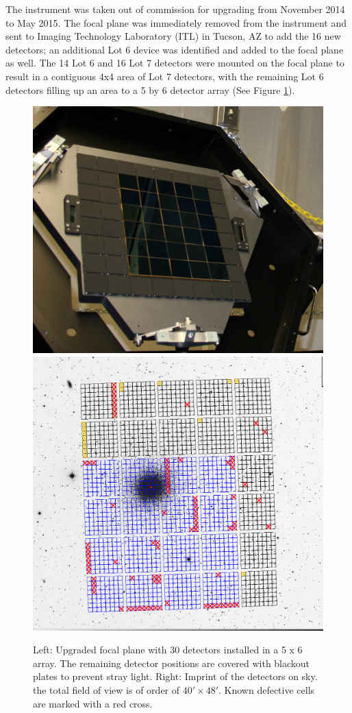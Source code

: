 \documentclass[]{spieman}
\begin{document}
The instrument was taken out of commission for upgrading from November 2014 to 
May 2015. The focal plane was immediately removed from the instrument and sent 
to  Imaging Technology Laboratory  (ITL) in Tucson, AZ to add the 16 new 
detectors; an additional Lot 6 device was identified and added to the focal 
plane as well. The 14 Lot 6 and 16 Lot 7 detectors were mounted on the focal 
plane to result in a contiguous 4x4 area of Lot 7 detectors, with the remaining 
Lot 6 detectors filling up an area to a 5 by 6 detector array (See Figure \ref{fig_focalplane}).


\begin{figure}
	\centering
	\hfill
	\includegraphics[height=0.4\textwidth]{images/detectorsOnFocalPlane5x6.jpg}
	\hfill
	\includegraphics[height=0.4\textwidth]{images/5ODI_Imprint.png}
	\hfill \\[1ex]
	
	\caption{\label{fig_focalplane} Left: Upgraded focal plane with 30 
	detectors installed in a 5 x 6 array. The remaining detector positions are 
	covered with blackout plates to prevent stray light. Right: Imprint of the 
	detectors on sky. the total field of view is of order of $40'\times 48'$. 
	Known defective cells are marked with a red cross. }
\end{figure}
\end{document}
